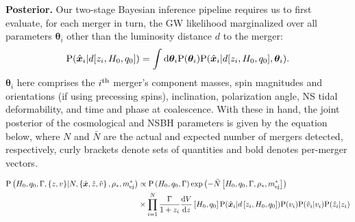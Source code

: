 \documentclass[%
 reprint,
 superscriptaddress,
 nofootinbib,
 amsmath,amssymb,
 aps,
]{revtex4-2}
\newcommand{\hubble}{\ensuremath{H_0}}
\newcommand{\decel}{\ensuremath{q_0}}
\newcommand{\prob}{\ensuremath{{\rm P}}}
\newcommand{\nexp}{\bar{N}}
\newcommand{\snrmin}{\rho_*}
\newcommand{\mejmin}{m_{\rm ej}^*}
\newcommand{\dgw}{\hat{\bm{x}}}
\begin{document}
{\bf Posterior.} Our two-stage Bayesian inference pipeline requires us to first evaluate, for each merger in turn, the GW likelihood marginalized over all parameters $\boldsymbol{\theta}_i$ other than the luminosity distance $d$ to the merger:
\begin{equation}
\prob(\dgw_i | d[ z_i, \hubble, \decel ]) = \int {\rm d}\boldsymbol{\theta}_i \prob(\boldsymbol{\theta}_i) \prob(\dgw_i | d[ z_i, \hubble, \decel ], \boldsymbol{\theta}_i).
\label{eq:marge_like}
\end{equation}
$\boldsymbol{\theta}_i$ here comprises the $i^{\rm th}$ merger's component masses, spin magnitudes and orientations (if using precessing spins), inclination, polarization angle, NS tidal deformability, and time and phase at coalescence. With these in hand, the joint posterior of the cosmological and NSBH parameters is given by the equation below, where $N$ and $\nexp$ are the actual and expected number of mergers detected, respectively, curly brackets denote sets of quantities and bold denotes per-merger vectors.
\begin{widetext}
\begin{align}
\prob \left( \hubble, \decel, \Gamma, \{z, v\} | N, \left\{ \dgw, \hat{z}, \hat{v} \right\}, \snrmin, \mejmin \right) & \propto
\prob \left( \hubble, \decel, \Gamma \right) \exp \left( -\bar{N} \left[ \hubble, \decel, \Gamma, \snrmin, \mejmin \right] \right) \label{eq:posterior} \\
& \times \prod_{i = 1}^{N} \frac{\Gamma}{1 + z_i} \frac{{\rm d}V}{{\rm d}z} \left[ \hubble, \decel \right] \prob (\dgw_i | d \left[ z_i, \hubble, \decel \right]) \prob(v_i) \prob(\hat{v}_i | v_i) \prob(\hat{z}_i | z_i) \nonumber
\end{align}
\end{widetext}


\end{document}
